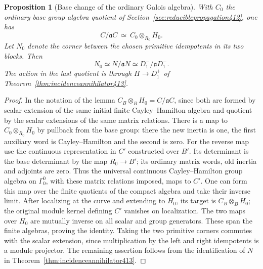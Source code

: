 \documentclass[a4paper,11pt]{article}
\newtheorem{proposition}{Proposition}[section]
\theoremstyle{definition}
\theoremstyle{remark}
\numberwithin{equation}{section}
\begin{document}
\begin{proposition}[Base change of the ordinary Galois algebra]\leavevmode
\label{prop:ordinarycorner414}
With \(C_0\) the ordinary base group algebra quotient of
Section~\ref{sec:reduciblepropagation412}, one has
\[
              C/\mathfrak a C\ \simeq\
                     C_0\otimes_{R_0}H_0 .
\]
Let \(N_0\) denote the corner between the chosen primitive
idempotents in its two blocks. Then
\[
                  N_0\simeq N/\mathfrak a N
                     \simeq D_1^-/\mathfrak a D_1^- .
\]
The action in the last quotient is through
\(H\to D_1^+\) of Theorem~\ref{thm:incidenceannihilator413}.
\end{proposition}
\begin{proof}
In the notation of the lemma \(C_B\otimes_B H_0=C/\mathfrak a C\),
since both are formed by scalar extension of the same
initial finite Cayley--Hamilton algebra and quotient by
the scalar extensions of the same matrix relations.
There is a map to \(C_0\otimes_{R_0}H_0\) by pullback from
the base group: there the new inertia is one, the first
auxiliary word is Cayley--Hamilton and the second is zero.
For the reverse map use the continuous representation in
\(C'\) constructed over \(B'\). Its determinant is the
base determinant by the map \(R_0\to B'\); its ordinary
matrix words, old inertia and adjoints are zero. Thus the
universal continuous Cayley--Hamilton group algebra on
\(\Gamma_0^0\), with these matrix relations imposed,
maps to \(C'\). One can form this map over the finite
quotients of the compact algebra and take their inverse
limit. After localizing at the curve and extending to
\(H_0\), its target is \(C_B\otimes_B H_0\); the original
module kernel defining \(C'\) vanishes on localization.
The two maps over \(H_0\) are mutually inverse on all scalar
and group generators. These span the finite algebras,
proving the identity. Taking the two primitive corners
commutes with the scalar extension, since multiplication
by the left and right idempotents is a module projector.
The remaining assertion follows from the identification of
\(N\) in Theorem~\ref{thm:incidenceannihilator413}.
\end{proof}
\end{document}

